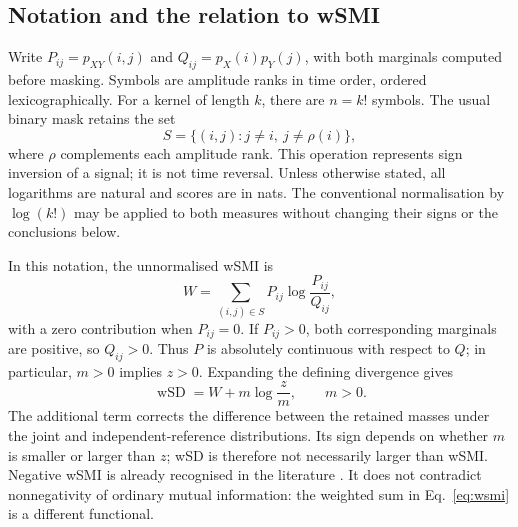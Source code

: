 \subsection{Notation and the relation to wSMI}
Write $P_{ij}=p_{XY}(i,j)$ and $Q_{ij}=p_X(i)p_Y(j)$, with both marginals computed before masking. Symbols are amplitude ranks in time order, ordered lexicographically. For a kernel of length $k$, there are $n=k!$ symbols. The usual binary mask retains the set
\[
S=\{(i,j):j\ne i,\ j\ne\rho(i)\},
\]
where $\rho$ complements each amplitude rank. This operation represents sign inversion of a signal; it is not time reversal. Unless otherwise stated, all logarithms are natural and scores are in nats. The conventional normalisation by $\log(k!)$ may be applied to both measures without changing their signs or the conclusions below.

In this notation, the unnormalised wSMI is
\begin{equation}
W=\sum_{(i,j)\in S}P_{ij}\log\frac{P_{ij}}{Q_{ij}},
\label{eq:wsmi}
\end{equation}
with a zero contribution when $P_{ij}=0$. If $P_{ij}>0$, both corresponding marginals are positive, so $Q_{ij}>0$. Thus $P$ is absolutely continuous with respect to $Q$; in particular, $m>0$ implies $z>0$. Expanding the defining divergence gives
\begin{equation}
\operatorname{wSD}=W+m\log\frac{z}{m},\qquad m>0.
\label{eq:correction}
\end{equation}
The additional term corrects the difference between the retained masses under the joint and independent-reference distributions. Its sign depends on whether $m$ is smaller or larger than $z$; wSD is therefore not necessarily larger than wSMI. Negative wSMI is already recognised in the literature \cite{imperatori2019eeg}. It does not contradict nonnegativity of ordinary mutual information: the weighted sum in Eq.~\eqref{eq:wsmi} is a different functional.

